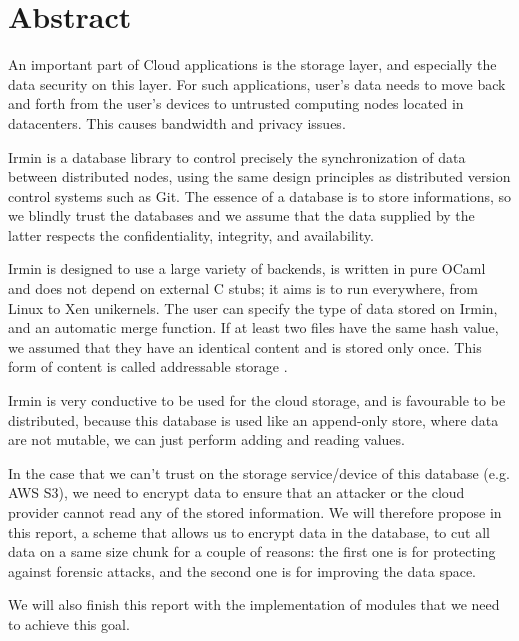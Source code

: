 \documentclass[10pt,a4paper]{report}
\begin{document}
\chapter{Abstract}

An important part of Cloud applications is the storage layer, and especially the data security on this layer.
For such applications, user's data needs to move back and forth from the user's devices to untrusted computing nodes located in datacenters. This causes bandwidth and privacy issues. \newline

Irmin is a database library to control precisely the synchronization of data between distributed nodes, using the same design principles as distributed version control systems such as Git. The essence of a database is to store informations, so we blindly trust the databases and we assume that the data supplied by the latter respects the confidentiality, integrity, and availability. \newline

Irmin is designed to use a large variety of backends, is written in pure OCaml and does not depend on external C stubs; it aims is to run everywhere, from Linux to Xen unikernels. The user can specify the type of data stored on Irmin, and an automatic merge function.
If at least two files have the same hash value, we assumed that they have an identical content and is stored only once. 
This form of content is called addressable storage \cite{anderson}. \newline
  
Irmin is very conductive to be used for the cloud storage, and is favourable to be distributed, because this database is used like an append-only store, where data are not mutable, we can just perform adding and reading values. \newline

In the case that we can't trust on the storage service/device of this database (e.g. AWS S3), we need to encrypt data to ensure that an attacker or the cloud provider cannot read any of the stored information. 
We will therefore propose in this report, a scheme that allows us to encrypt data in the database, to cut all data on a same size chunk for a couple of reasons: the first one is for protecting against forensic  attacks, and the second one is for improving the data space.   \newline
 
We will also finish this report with the implementation of modules that we need to achieve this goal. \newline
\end{document}
